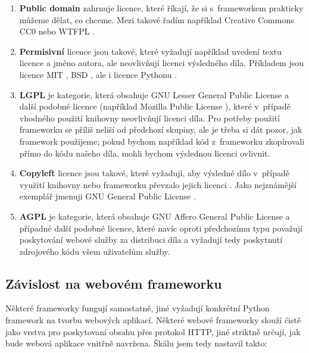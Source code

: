 \begin{enumerate}
\def\labelenumi{\arabic{enumi}.}
\tightlist
\item
  \textbf{Public domain} zahrnuje licence, které říkají, že si s~frameworkem prakticky můžeme dělat, co chceme. Mezi takové řadím například Creative Commons CC0 \autocite{CC0} nebo WTFPL \autocite{WTFPL}.
\item
  \textbf{Permisivní} licence jsou takové, které vyžadují například uvedení textu licence a jméno autora, ale neovlivňují licenci výsledného díla. Příkladem jsou licence MIT \autocite{MIT}, BSD \autocite{BSD2}\autocite{BSD3}, ale i licence Pythonu \autocite{python-license}.
\item
  \textbf{LGPL} je kategorie, která obsahuje GNU Lesser General Public License \autocite{LGPL} a další podobné licence (například Mozilla Public License \autocite{mpl2}), které v~případě vhodného použití knihovny neovlivňují licenci díla. Pro potřeby použití frameworku se příliš neliší od předchozí skupiny, ale je třeba si dát pozor, jak framework použijeme; pokud bychom například kód z~frameworku zkopírovali přímo do kódu našeho díla, mohli bychom výslednou licenci ovlivnit.
\item
  \textbf{Copyleft} licence jsou takové, které vyžadují, aby výsledné dílo v~případě využití knihovny nebo frameworku převzalo jejich licenci \autocite{copyleft}. Jako nejznámější exemplář jmenuji GNU General Public License \autocite{GPLv3}.
\item
  \textbf{AGPL} je kategorie, která obsahuje GNU Affero General Public License \autocite{AGPLv3} a případné další podobné licence, které navíc oproti předchozímu typu považují poskytování webové služby za distribuci díla a vyžadují tedy poskytnutí zdrojového kódu všem uživatelům služby.
\end{enumerate}

\subsection{Závislost na webovém frameworku}\label{zuxe1vislost-na-webovuxe9m-frameworku}

Některé frameworky fungují samostatně, jiné vyžadují konkrétní Python framework na tvorbu webových aplikací. Některé webové frameworky slouží čistě jako vrstva pro poskytovaní obsahu přes protokol HTTP, jiné striktně určují, jak bude webová aplikace vnitřně navržena. Škálu jsem tedy nastavil takto:

